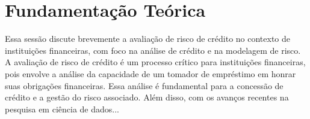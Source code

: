 \chapter{Fundamentação Teórica}
\label{cap:fundamentacaoTeorica}

Essa sessão discute brevemente a avaliação de risco de crédito no contexto de
instituições financeiras, com foco na análise de crédito e na
modelagem de risco.
A avaliação de risco de crédito é um processo crítico para instituições
financeiras, pois envolve a análise da capacidade de um tomador de empréstimo em
honrar suas obrigações financeiras. Essa análise é fundamental para a concessão
de crédito e a gestão do risco associado. Além disso, com os avanços recentes na
pesquisa em ciência de dados...


